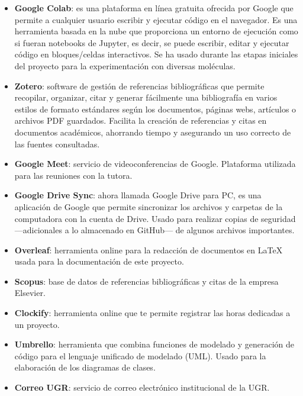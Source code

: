 \begin{itemize}
    \item \textbf{Google Colab}: es una plataforma en línea gratuita ofrecida por Google que permite a cualquier usuario escribir y ejecutar código en el navegador. Es una herramienta basada en la nube que proporciona un entorno de ejecución como si fueran notebooks de Jupyter, es decir, se puede escribir, editar y ejecutar código en bloques/celdas interactivos. Se ha usado durante las etapas iniciales del proyecto para la experimentación con diversas moléculas.
    
    \item \textbf{Zotero}: software de gestión de referencias bibliográficas que permite recopilar, organizar, citar y generar fácilmente una bibliografía en varios estilos de formato estándares según los documentos, páginas webs, artículos o archivos PDF guardados. Facilita la creación de referencias y citas en documentos académicos, ahorrando tiempo y asegurando un uso correcto de las fuentes consultadas.
    
    \item \textbf{Google Meet}: servicio de videoconferencias de Google. Plataforma utilizada para las reuniones con la tutora.

    \item \textbf{Google Drive Sync}: ahora llamada Google Drive para PC, es una aplicación de Google que permite sincronizar los archivos y carpetas de la computadora con la cuenta de Drive. Usado para realizar copias de seguridad —adicionales a lo almacenado en GitHub— de algunos archivos importantes. 

    \item \textbf{Overleaf}: herramienta online para la redacción de documentos en LaTeX usada para la documentación de este proyecto.

    \item \textbf{Scopus}: base de datos de referencias bibliográficas y citas de la empresa Elsevier.

    \item \textbf{Clockify}: herramienta online que te permite registrar las horas dedicadas a un proyecto.

    \item \textbf{Umbrello}: herramienta que combina funciones de modelado y generación de código para el lenguaje unificado de modelado (UML). Usado para la elaboración de los diagramas de clases.

    \item \textbf{Correo UGR}: servicio de correo electrónico institucional de la UGR.


\end{itemize}
